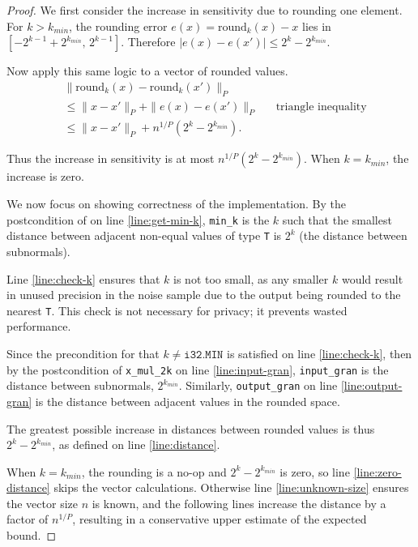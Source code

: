 \documentclass{article}
\begin{document}
\begin{proof}
    We first consider the increase in sensitivity due to rounding one element.
    For $k>k_{min}$, the rounding error $e(x)=\mathrm{round}_k(x)-x$
    lies in $[-2^{k-1}+2^{k_{min}},\,2^{k-1}]$.
    Therefore $|e(x)-e(x')|\leq 2^k-2^{k_{min}}$.

    Now apply this same logic to a vector of rounded values.
    \begin{align}
        &\|\mathrm{round}_k(x)-\mathrm{round}_k(x')\|_P \\
        &\leq \|x-x'\|_P + \|e(x)-e(x')\|_P &&\text{triangle inequality} \\
        &\leq \|x-x'\|_P + n^{1/P}(2^k-2^{k_{min}}).
    \end{align}

    Thus the increase in sensitivity is at most $n^{1/P}(2^k-2^{k_{min}})$.
    When $k=k_{min}$, the increase is zero.

    We now focus on showing correctness of the implementation.
    By the postcondition of  on line \ref{line:get-min-k},
    \texttt{min\_k} is the $k$ such that the smallest distance between adjacent non-equal values of type \texttt{T} is $2^k$
    (the distance between subnormals).

    Line \ref{line:check-k} ensures that $k$ is not too small,
    as any smaller $k$ would result in unused precision in the noise sample
    due to the output being rounded to the nearest \texttt{T}.
    This check is not necessary for privacy; it prevents wasted performance.

    Since the precondition for  that $k \neq \texttt{i32.MIN}$ is satisfied on line \ref{line:check-k},
    then by the postcondition of \texttt{x\_mul\_2k} on line \ref{line:input-gran},
    \texttt{input\_gran} is the distance between subnormals, $2^{k_{min}}$.
    Similarly, \texttt{output\_gran} on line \ref{line:output-gran} is the distance between adjacent values in the rounded space.

    The greatest possible increase in distances between rounded values is thus $2^{k} - 2^{k_{min}}$,
    as defined on line \ref{line:distance}.

    When $k = k_{min}$, the rounding is a no-op and $2^k - 2^{k_{min}}$ is zero,
    so line \ref{line:zero-distance} skips the vector calculations.
    Otherwise line \ref{line:unknown-size} ensures the vector size $n$ is known,
    and the following lines increase the distance by a factor of $n^{1/P}$,
    resulting in a conservative upper estimate of the expected bound.
\end{proof}
\end{document}
